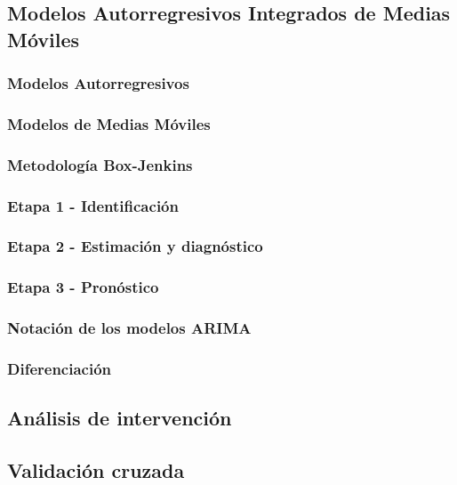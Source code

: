 \documentclass[
]{article}
\begin{document}
\subsection{Modelos Autorregresivos Integrados de Medias Móviles}

\subsubsection{Modelos Autorregresivos}

\subsubsection{Modelos de Medias Móviles}

\subsubsection{Metodología Box-Jenkins}

\subsubsection{Etapa 1 - Identificación}

\subsubsection{Etapa 2 - Estimación y diagnóstico}

\subsubsection{Etapa 3 - Pronóstico}

\subsubsection{Notación de los modelos ARIMA}

\subsubsection{Diferenciación}

\subsection{Análisis de intervención}

\subsection{Validación cruzada}
\end{document}
